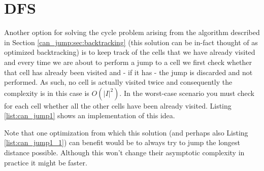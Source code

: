 	
 
\section{DFS}
\label{can_jump:sec:DFS}
Another option for solving the cycle problem arising from the algorithm described in Section
\ref{can_jump:sec:backtracking} (this solution can be in-fact thought of as optimized backtracking)
is to keep track of the cells that we have already visited and every time we are about to perform a
jump to a cell we first check whether that cell has already been visited and  - if it has - 
the jump is discarded and not performed. As such, no cell is actually visited twice and consequently the complexity is in this case is $O(|I|^2)$. In the worst-case scenario you must check for each
cell whether all the other cells have been already visited. Listing \ref{list:can_jump1} shows an
implementation of this idea. 




Note that one optimization from which this solution (and perhaps also Listing
\ref{list:can_jump1_1}) can benefit would be to always try to jump the longest distance possible.
Although this won't change their asymptotic complexity in practice it might be faster.


